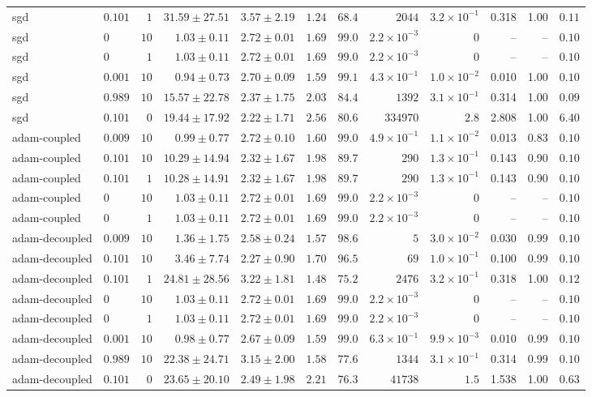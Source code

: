 \begin{tabular}{llrrrrrrrrrr}
sgd & $0.101$ & $1$ & $31.59\pm27.51$ & $3.57\pm2.19$ & $1.24$ & $68.4$ & $2044$ & $3.2\times10^{-1}$ & 0.318 & 1.00 & $0.11$ \\
sgd & $0$ & $10$ & $1.03\pm0.11$ & $2.72\pm0.01$ & $1.69$ & $99.0$ & $2.2\times10^{-3}$ & $0$ & -- & -- & $0.10$ \\
sgd & $0$ & $1$ & $1.03\pm0.11$ & $2.72\pm0.01$ & $1.69$ & $99.0$ & $2.2\times10^{-3}$ & $0$ & -- & -- & $0.10$ \\
sgd & $0.001$ & $10$ & $0.94\pm0.73$ & $2.70\pm0.09$ & $1.59$ & $99.1$ & $4.3\times10^{-1}$ & $1.0\times10^{-2}$ & 0.010 & 1.00 & $0.10$ \\
sgd & $0.989$ & $10$ & $15.57\pm22.78$ & $2.37\pm1.75$ & $2.03$ & $84.4$ & $1392$ & $3.1\times10^{-1}$ & 0.314 & 1.00 & $0.09$ \\
sgd & $0.101$ & $0$ & $19.44\pm17.92$ & $2.22\pm1.71$ & $2.56$ & $80.6$ & $334970$ & $2.8$ & 2.808 & 1.00 & $6.40$ \\
adam-coupled & $0.009$ & $10$ & $0.99\pm0.77$ & $2.72\pm0.10$ & $1.60$ & $99.0$ & $4.9\times10^{-1}$ & $1.1\times10^{-2}$ & 0.013 & 0.83 & $0.10$ \\
adam-coupled & $0.101$ & $10$ & $10.29\pm14.94$ & $2.32\pm1.67$ & $1.98$ & $89.7$ & $290$ & $1.3\times10^{-1}$ & 0.143 & 0.90 & $0.10$ \\
adam-coupled & $0.101$ & $1$ & $10.28\pm14.91$ & $2.32\pm1.67$ & $1.98$ & $89.7$ & $290$ & $1.3\times10^{-1}$ & 0.143 & 0.90 & $0.10$ \\
adam-coupled & $0$ & $10$ & $1.03\pm0.11$ & $2.72\pm0.01$ & $1.69$ & $99.0$ & $2.2\times10^{-3}$ & $0$ & -- & -- & $0.10$ \\
adam-coupled & $0$ & $1$ & $1.03\pm0.11$ & $2.72\pm0.01$ & $1.69$ & $99.0$ & $2.2\times10^{-3}$ & $0$ & -- & -- & $0.10$ \\
adam-decoupled & $0.009$ & $10$ & $1.36\pm1.75$ & $2.58\pm0.24$ & $1.57$ & $98.6$ & $5$ & $3.0\times10^{-2}$ & 0.030 & 0.99 & $0.10$ \\
adam-decoupled & $0.101$ & $10$ & $3.46\pm7.74$ & $2.27\pm0.90$ & $1.70$ & $96.5$ & $69$ & $1.0\times10^{-1}$ & 0.100 & 0.99 & $0.10$ \\
adam-decoupled & $0.101$ & $1$ & $24.81\pm28.56$ & $3.22\pm1.81$ & $1.48$ & $75.2$ & $2476$ & $3.2\times10^{-1}$ & 0.318 & 1.00 & $0.12$ \\
adam-decoupled & $0$ & $10$ & $1.03\pm0.11$ & $2.72\pm0.01$ & $1.69$ & $99.0$ & $2.2\times10^{-3}$ & $0$ & -- & -- & $0.10$ \\
adam-decoupled & $0$ & $1$ & $1.03\pm0.11$ & $2.72\pm0.01$ & $1.69$ & $99.0$ & $2.2\times10^{-3}$ & $0$ & -- & -- & $0.10$ \\
adam-decoupled & $0.001$ & $10$ & $0.98\pm0.77$ & $2.67\pm0.09$ & $1.59$ & $99.0$ & $6.3\times10^{-1}$ & $9.9\times10^{-3}$ & 0.010 & 0.99 & $0.10$ \\
adam-decoupled & $0.989$ & $10$ & $22.38\pm24.71$ & $3.15\pm2.00$ & $1.58$ & $77.6$ & $1344$ & $3.1\times10^{-1}$ & 0.314 & 0.99 & $0.10$ \\
adam-decoupled & $0.101$ & $0$ & $23.65\pm20.10$ & $2.49\pm1.98$ & $2.21$ & $76.3$ & $41738$ & $1.5$ & 1.538 & 1.00 & $0.63$ \\
\bottomrule
\end{tabular}
